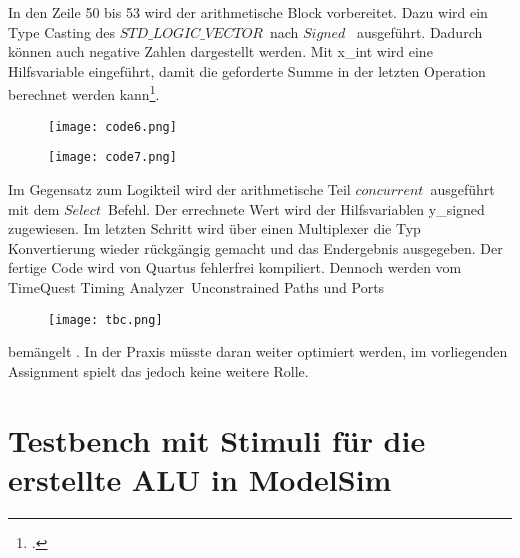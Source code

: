 \documentclass[12pt,a4paper]{scrartcl}	%
\begin{document}
In den Zeile 50 bis 53 wird der arithmetische Block vorbereitet. Dazu wird ein Type Casting des $STD\_LOGIC\_VECTOR$~nach $Signed$~ ausgeführt. Dadurch können auch negative Zahlen dargestellt werden. Mit x\_int wird eine Hilfsvariable eingeführt, damit die geforderte Summe in der letzten Operation berechnet werden kann\footcite[vgl.][S. 128 f.]{VHDL}. 
\begin{figure}[hbt]
	
	\texttt{[image: code6.png]}
\end{figure}
\begin{figure}[bth]
	
	\texttt{[image: code7.png]}
\end{figure}
Im Gegensatz zum Logikteil wird der arithmetische Teil $concurrent$~ausgeführt mit dem $Select$~Befehl. 
Der errechnete Wert wird der Hilfsvariablen y\_signed zugewiesen. Im letzten Schritt wird über einen Multiplexer die Typ Konvertierung wieder rückgängig gemacht und das Endergebnis ausgegeben.
Der fertige Code wird von Quartus fehlerfrei kompiliert. Dennoch werden vom \glqq TimeQuest Timing Analyzer\grqq~\glqq Unconstrained Paths und Ports\grqq
\begin{figure}[hbt]
	
	\texttt{[image: tbc.png]}
\end{figure}
bemängelt . In der Praxis müsste daran weiter optimiert werden, im vorliegenden Assignment spielt das jedoch keine weitere Rolle.
\section{Testbench mit Stimuli für die erstellte ALU in ModelSim}
\end{document}
